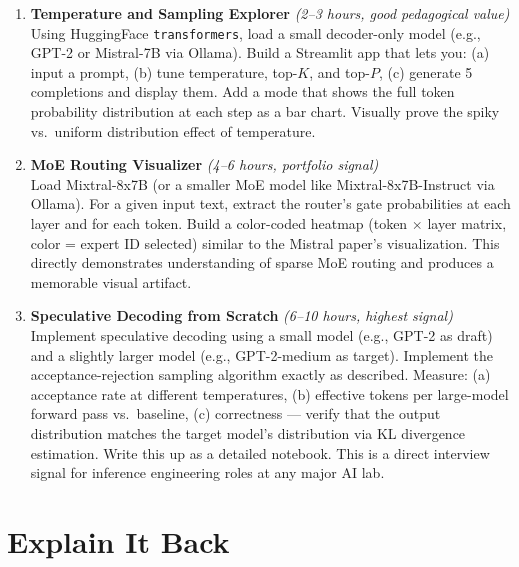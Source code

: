 \documentclass[11pt, a4paper]{article}
\begin{document}
\begin{enumerate}[leftmargin=2em]
  \item \textbf{Temperature and Sampling Explorer} \textit{(2--3 hours, good pedagogical value)}\\
  Using HuggingFace \texttt{transformers}, load a small decoder-only model (e.g., GPT-2 or Mistral-7B via Ollama). Build a Streamlit app that lets you: (a) input a prompt, (b) tune temperature, top-$K$, and top-$P$, (c) generate 5 completions and display them. Add a mode that shows the full token probability distribution at each step as a bar chart. Visually prove the spiky vs.\ uniform distribution effect of temperature.

  \item \textbf{MoE Routing Visualizer} \textit{(4--6 hours, portfolio signal)}\\
  Load Mixtral-8x7B (or a smaller MoE model like Mixtral-8x7B-Instruct via Ollama). For a given input text, extract the router's gate probabilities at each layer and for each token. Build a color-coded heatmap (token $\times$ layer matrix, color = expert ID selected) similar to the Mistral paper's visualization. This directly demonstrates understanding of sparse MoE routing and produces a memorable visual artifact.

  \item \textbf{Speculative Decoding from Scratch} \textit{(6--10 hours, highest signal)}\\
  Implement speculative decoding using a small model (e.g., GPT-2 as draft) and a slightly larger model (e.g., GPT-2-medium as target). Implement the acceptance-rejection sampling algorithm exactly as described. Measure: (a) acceptance rate at different temperatures, (b) effective tokens per large-model forward pass vs.\ baseline, (c) correctness --- verify that the output distribution matches the target model's distribution via KL divergence estimation. Write this up as a detailed notebook. This is a direct interview signal for inference engineering roles at any major AI lab.
\end{enumerate}

\newpage
\section{Explain It Back}
\end{document}
